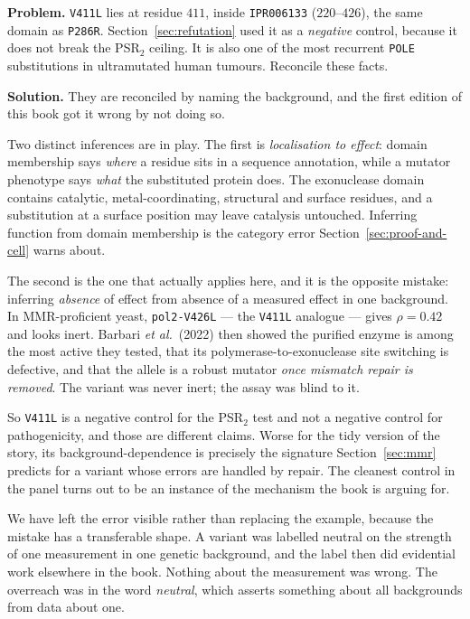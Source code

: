 \begin{worked}
\textbf{Problem.} \texttt{V411L} lies at residue $411$, inside \texttt{IPR006133}
($220$--$426$), the same domain as \texttt{P286R}. Section~\ref{sec:refutation}
used it as a \emph{negative} control, because it does not break the PSR$_2$
ceiling. It is also one of the most recurrent \texttt{POLE} substitutions in
ultramutated human tumours. Reconcile these facts.

\textbf{Solution.} They are reconciled by naming the background, and the first
edition of this book got it wrong by not doing so.

Two distinct inferences are in play. The first is \emph{localisation to effect}:
domain membership says \emph{where} a residue sits in a sequence annotation,
while a mutator phenotype says \emph{what} the substituted protein does. The
exonuclease domain contains catalytic, metal-coordinating, structural and surface
residues, and a substitution at a surface position may leave catalysis untouched.
Inferring function from domain membership is the category error
Section~\ref{sec:proof-and-cell} warns about.

The second is the one that actually applies here, and it is the opposite mistake:
inferring \emph{absence} of effect from absence of a measured effect in one
background. In MMR-proficient yeast, \texttt{pol2-V426L} --- the \texttt{V411L}
analogue --- gives $\rho = 0.42$ and looks inert. Barbari \emph{et al.}\ (2022)
then showed the purified enzyme is among the most active they tested, that its
polymerase-to-exonuclease site switching is defective, and that the allele is a
robust mutator \emph{once mismatch repair is removed}. The variant was never
inert; the assay was blind to it.

So \texttt{V411L} is a negative control for the PSR$_2$ test and not a negative
control for pathogenicity, and those are different claims. Worse for the tidy
version of the story, its background-dependence is precisely the signature
Section~\ref{sec:mmr} predicts for a variant whose errors are handled by repair.
The cleanest control in the panel turns out to be an instance of the mechanism
the book is arguing for.
\end{worked}

\begin{remark}
We have left the error visible rather than replacing the example, because the
mistake has a transferable shape. A variant was labelled neutral on the strength
of one measurement in one genetic background, and the label then did evidential
work elsewhere in the book. Nothing about the measurement was wrong. The
overreach was in the word \emph{neutral}, which asserts something about all
backgrounds from data about one.
\end{remark}

